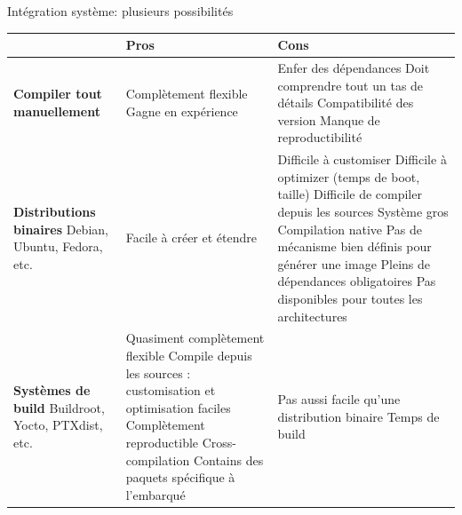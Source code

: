 \begin{frame}{Intégration système: plusieurs possibilités}
  \tiny
  \begin{tabularx}{14cm}{|X|X|X|}
    \hline
    & {\bf Pros} & {\bf Cons} \\
    \hline
    {\bf Compiler tout manuellement} &
    Complètement flexible \newline
    Gagne en expérience &
    Enfer des dépendances \newline
    Doit comprendre tout un tas de détails \newline
    Compatibilité des version \newline
    Manque de reproductibilité \\
    \hline
    {\bf Distributions binaires} \newline Debian, Ubuntu, Fedora, etc.
    &
    Facile à créer et étendre
    &
    Difficile à customiser \newline
    Difficile à optimizer (temps de boot, taille) \newline
    Difficile de compiler depuis les sources \newline
    Système gros \newline
    Compilation native \newline
    Pas de mécanisme bien définis pour générer une image \newline
    Pleins de dépendances obligatoires \newline
    Pas disponibles pour toutes les architectures \\
    \hline
    {\bf Systèmes de build} \newline Buildroot, Yocto, PTXdist, etc.
    &
    Quasiment complètement flexible \newline
    Compile depuis les sources : customisation et optimisation faciles \newline
    Complètement reproductible \newline
    Cross-compilation \newline
    Contains des paquets spécifique à l'embarqué \newline
    &
    Pas aussi facile qu'une distribution binaire \newline
    Temps de build \\
    \hline
  \end{tabularx}
\end{frame}

